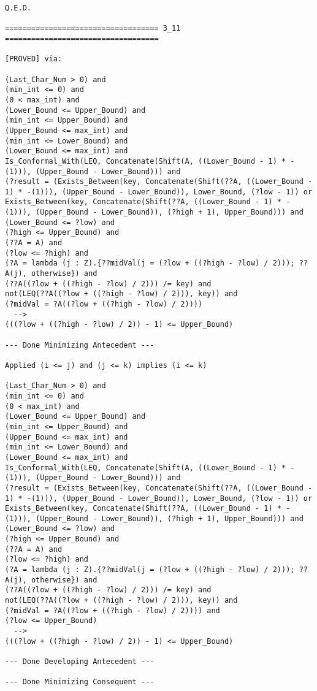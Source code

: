 \begin{lstlisting}[language=resolve]
Q.E.D.

=================================== 3_11 ===================================

[PROVED] via:

(Last_Char_Num > 0) and
(min_int <= 0) and
(0 < max_int) and
(Lower_Bound <= Upper_Bound) and
(min_int <= Upper_Bound) and
(Upper_Bound <= max_int) and
(min_int <= Lower_Bound) and
(Lower_Bound <= max_int) and
Is_Conformal_With(LEQ, Concatenate(Shift(A, ((Lower_Bound - 1) * -(1))), (Upper_Bound - Lower_Bound))) and
(?result = (Exists_Between(key, Concatenate(Shift(??A, ((Lower_Bound - 1) * -(1))), (Upper_Bound - Lower_Bound)), Lower_Bound, (?low - 1)) or Exists_Between(key, Concatenate(Shift(??A, ((Lower_Bound - 1) * -(1))), (Upper_Bound - Lower_Bound)), (?high + 1), Upper_Bound))) and
(Lower_Bound <= ?low) and
(?high <= Upper_Bound) and
(??A = A) and
(?low <= ?high) and
(?A = lambda (j : Z).{??midVal(j = (?low + ((?high - ?low) / 2))); ??A(j), otherwise}) and
(??A((?low + ((?high - ?low) / 2))) /= key) and
not(LEQ(??A((?low + ((?high - ?low) / 2))), key)) and
(?midVal = ?A((?low + ((?high - ?low) / 2))))
  -->
(((?low + ((?high - ?low) / 2)) - 1) <= Upper_Bound)

--- Done Minimizing Antecedent ---

Applied (i <= j) and (j <= k) implies (i <= k)

(Last_Char_Num > 0) and
(min_int <= 0) and
(0 < max_int) and
(Lower_Bound <= Upper_Bound) and
(min_int <= Upper_Bound) and
(Upper_Bound <= max_int) and
(min_int <= Lower_Bound) and
(Lower_Bound <= max_int) and
Is_Conformal_With(LEQ, Concatenate(Shift(A, ((Lower_Bound - 1) * -(1))), (Upper_Bound - Lower_Bound))) and
(?result = (Exists_Between(key, Concatenate(Shift(??A, ((Lower_Bound - 1) * -(1))), (Upper_Bound - Lower_Bound)), Lower_Bound, (?low - 1)) or Exists_Between(key, Concatenate(Shift(??A, ((Lower_Bound - 1) * -(1))), (Upper_Bound - Lower_Bound)), (?high + 1), Upper_Bound))) and
(Lower_Bound <= ?low) and
(?high <= Upper_Bound) and
(??A = A) and
(?low <= ?high) and
(?A = lambda (j : Z).{??midVal(j = (?low + ((?high - ?low) / 2))); ??A(j), otherwise}) and
(??A((?low + ((?high - ?low) / 2))) /= key) and
not(LEQ(??A((?low + ((?high - ?low) / 2))), key)) and
(?midVal = ?A((?low + ((?high - ?low) / 2)))) and
(?low <= Upper_Bound)
  -->
(((?low + ((?high - ?low) / 2)) - 1) <= Upper_Bound)

--- Done Developing Antecedent ---

--- Done Minimizing Consequent ---


\end{lstlisting}

